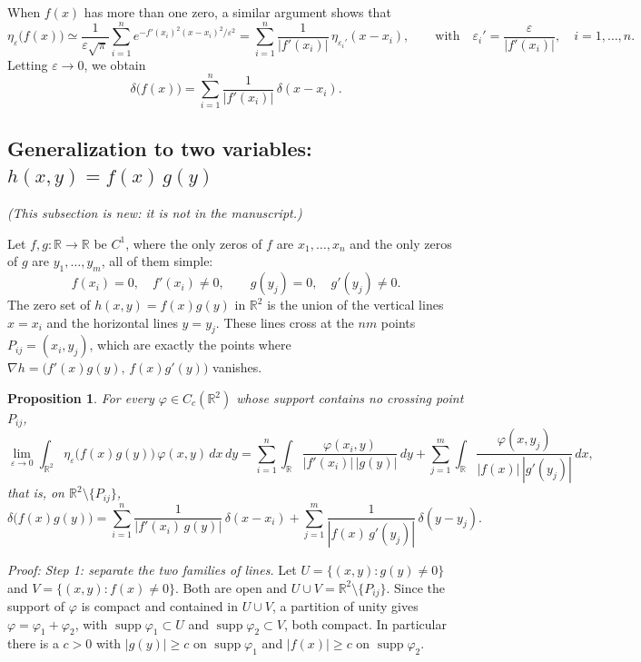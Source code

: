 \documentclass[11pt]{article}
\newtheorem{proposition}{Proposition}[section]
\newcommand{\R}{\mathbb{R}}
\begin{document}
When $f(x)$ has more than one zero, a similar argument shows that
\[
  \eta_\varepsilon\bigl(f(x)\bigr)\simeq\frac{1}{\varepsilon\sqrt{\pi}}
  \sum_{i=1}^{n}e^{-f'(x_i)^2(x-x_i)^2/\varepsilon^2}
  =\sum_{i=1}^{n}\frac{1}{|f'(x_i)|}\,\eta_{\varepsilon_i'}(x-x_i),
  \qquad\text{with}\quad \varepsilon_i'=\frac{\varepsilon}{|f'(x_i)|},
  \quad i=1,\dots,n.
\]
Letting $\varepsilon\to0$, we obtain
\[
  \delta\bigl(f(x)\bigr)=\sum_{i=1}^{n}\frac{1}{|f'(x_i)|}\,\delta(x-x_i).
\]

\subsection{Generalization to two variables: $h(x,y)=f(x)\,g(y)$}%
\label{app:1-2d}

\noindent\textit{(This subsection is new: it is not in the manuscript.)}

Let $f,g\colon\R\to\R$ be $C^1$, where the only zeros of $f$ are
$x_1,\dots,x_n$ and the only zeros of $g$ are $y_1,\dots,y_m$, all of them
simple:
\[
  f(x_i)=0,\quad f'(x_i)\neq0,\qquad g(y_j)=0,\quad g'(y_j)\neq0 .
\]
The zero set of $h(x,y)=f(x)g(y)$ in $\R^2$ is the union of the vertical lines
$x=x_i$ and the horizontal lines $y=y_j$. These lines cross at the $nm$ points
$P_{ij}=(x_i,y_j)$, which are exactly the points where
$\nabla h=\bigl(f'(x)g(y),\,f(x)g'(y)\bigr)$ vanishes.

\begin{proposition}
For every $\varphi\in C_c(\R^2)$ whose support contains no crossing point
$P_{ij}$,
\[
  \lim_{\varepsilon\to0}\int_{\R^2}\eta_\varepsilon\bigl(f(x)g(y)\bigr)\,
  \varphi(x,y)\,dx\,dy
  =\sum_{i=1}^{n}\int_\R\frac{\varphi(x_i,y)}{|f'(x_i)|\,|g(y)|}\,dy
  +\sum_{j=1}^{m}\int_\R\frac{\varphi(x,y_j)}{|f(x)|\,|g'(y_j)|}\,dx ,
\]
that is, on $\R^2\setminus\{P_{ij}\}$,
\begin{equation}\label{eq:delta2d}
  \delta\bigl(f(x)g(y)\bigr)
  =\sum_{i=1}^{n}\frac{1}{|f'(x_i)\,g(y)|}\,\delta(x-x_i)
  +\sum_{j=1}^{m}\frac{1}{|f(x)\,g'(y_j)|}\,\delta(y-y_j).
\end{equation}
\end{proposition}

\noindent\textit{Proof:}
\emph{Step 1: separate the two families of lines.} Let
$U=\{(x,y):g(y)\neq0\}$ and $V=\{(x,y):f(x)\neq0\}$. Both are open and
$U\cup V=\R^2\setminus\{P_{ij}\}$. Since the support of $\varphi$ is compact
and contained in $U\cup V$, a partition of unity gives
$\varphi=\varphi_1+\varphi_2$, with $\operatorname{supp}\varphi_1\subset U$ and
$\operatorname{supp}\varphi_2\subset V$, both compact. In particular there is
a $c>0$ with $|g(y)|\ge c$ on $\operatorname{supp}\varphi_1$ and
$|f(x)|\ge c$ on $\operatorname{supp}\varphi_2$.
\end{document}
